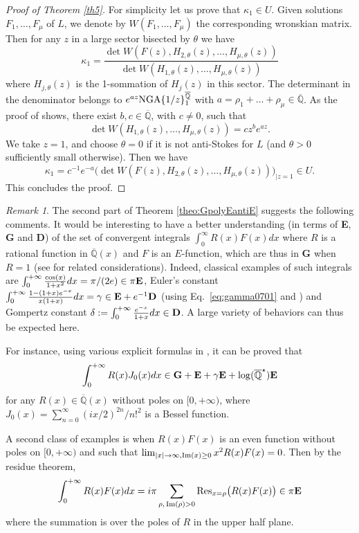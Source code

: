 \documentclass[reqno,12pt]{article}
\numberwithin{equation}{section}
\theoremstyle{remark}
\newtheorem{Remark}{Remark}
\newcommand{\Qbar}{\overline{\mathbb Q}}
\renewcommand{\Im}{{\rm Im}}
\begin{document}
\begin{proof}[Proof of Theorem \ref{th5}]
For simplicity let us prove that $\kappa_1\in U$. Given solutions $F_1,\ldots,F_\mu$ of $L$, we denote by $W( F_1,\ldots,F_\mu)$ the corresponding wronskian matrix. Then for any $z$ in a large sector
bisected by  $\theta$ we have 
$$ \kappa_1 = \frac{ \det W( F(z), H_{2,\theta}(z), \ldots,  H_{\mu,\theta}(z) )}{ \det W(   H_{1,\theta}(z), \ldots,  H_{\mu,\theta}(z) )}$$
where $H_{j,\theta}(z)$ is the 1-sommation of $H_j(z)$ in this sector. The determinant in the denominator belongs to $e^{a z} {\rm NGA}\{1/z\}_1^{\Qbar}$
with $a  = \rho_1+\ldots+\rho_\mu\in\Qbar$. As the proof of \cite[Theorem~6]{fuchsien} shows, there exist $b,c\in\Qbar$, with $c\neq 0$,  such that 
$$  \det W(   H_{1,\theta}(z), \ldots,  H_{\mu,\theta}(z) ) = c z^b e^{az} . $$
We take $z=1$, and choose $\theta=0$ if it is not anti-Stokes for $L$ (and $\theta>0$ sufficiently small otherwise). Then we have 
$$\kappa_1 = c^{-1} e^{-a} \Big(  \det W( F(z), H_{2,\theta}(z), \ldots,  H_{\mu,\theta}(z) ) \Big)_{| z=1}\in U.$$
This concludes the proof.
\end{proof}

\begin{Remark} The second part of Theorem \ref{theo:GpolyEantiE} suggests the following comments. It would be interesting to have a better understanding (in terms of {\bf E}, {\bf G} and {\bf D}) of the set of convergent integrals $\int_0^\infty R(x)F(x)dx$ where $R$ is a rational function in $\Qbar(x)$ and $F$ is an $E$-function, which are thus in {\bf G} when $R=1$ (see \cite{rivoalnote} for related considerations). Indeed, classical examples of such integrals are $\int_0^{+\infty} \frac{\cos(x)}{1+x^2} dx=\pi/(2e)  \in \pi {\bf E}$, Euler's constant $ \int_0^{+\infty} \frac{1-(1+x)e^{-x}}{x(1+x)} dx = \gamma \in {\bf E}+e^{-1}{\bf D}$ (using Eq.~\eqref{eq:gamma0701} and \cite[p.~248, Example~2]{WW}) and Gompertz constant $\delta:=\int_0^{+\infty} \frac{e^{-x}}{1+x} dx\in {\bf D}$. A large variety of behaviors can  thus be expected here. 

 For instance, using various explicit formulas in \cite[Chapters 6.5--6.7]{graryz}, it can be proved that
 $$
 \int_0^{+\infty} R(x)J_0(x)dx \in {\bf G}+ {\bf E}+ \gamma{\bf E}+\log(\Qbar^\star){\bf E}
 $$
 for any $R(x)\in \Qbar(x)$ without poles on $[0,+\infty)$, where $J_0(x)=\sum_{n=0}^{\infty} (ix/2)^{2n}/n!^2$ is a Bessel function.
 
A second class of examples is when $R(x)F(x)$ is an even function without poles on $[0,+\infty)$ and such that $\lim_{|x|\to \infty, \Im(x)\ge0} x^2 R(x)F(x)=0$. Then by the residue theorem,  
$$
\int_0^{+\infty} R(x)F(x)dx = i\pi\sum_{\rho, \, \Im(\rho)>0} \textup{Res}_{x=\rho}\big(R(x)F(x)\big)\in \pi {\bf E}
$$
where the summation is over the poles of $R$ in the upper half plane. 
\end{Remark}
\end{document}
